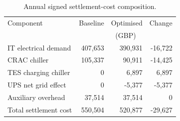 \begin{table}[!t]
\centering
\caption{Annual signed settlement-cost composition.}
\label{tab:annual-components}
\begin{tabular}{lrrr}
\toprule
Component & Baseline & Optimised & Change \\
 & \multicolumn{3}{c}{(GBP)} \\
\midrule
IT electrical demand & 407,653 & 390,931 & -16,722 \\
CRAC chiller & 105,337 & 90,911 & -14,425 \\
TES charging chiller & 0 & 6,897 & 6,897 \\
UPS net grid effect & 0 & -5,377 & -5,377 \\
Auxiliary overhead & 37,514 & 37,514 & 0 \\
\midrule
Total settlement cost & 550,504 & 520,877 & -29,627 \\
\bottomrule
\end{tabular}
\end{table}
